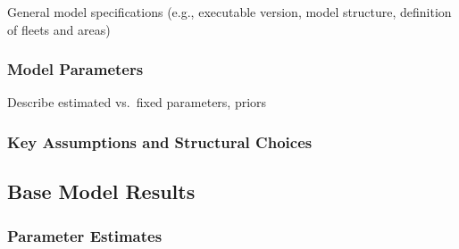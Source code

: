 \documentclass[11pt,
  english,
  a4paper,
]{article}
\begin{document}
\leavevmode\tagmcend\tagstructend


General model specifications (e.g., executable version, model structure, definition of fleets and areas)

\leavevmode\tagmcend\tagstructend\par


\hypertarget{model-parameters}{%
\subsubsection{Model Parameters}\label{model-parameters}}

\leavevmode\tagmcend\tagstructend


Describe estimated vs.~fixed parameters, priors

\leavevmode\tagmcend\tagstructend\par


\hypertarget{key-assumptions-and-structural-choices}{%
\subsubsection{Key Assumptions and Structural Choices}\label{key-assumptions-and-structural-choices}}

\leavevmode\tagmcend\tagstructend


\hypertarget{base-model-results}{%
\subsection{Base Model Results}\label{base-model-results}}

\leavevmode\tagmcend\tagstructend


\hypertarget{parameter-estimates}{%
\subsubsection{Parameter Estimates}\label{parameter-estimates}}

\leavevmode\tagmcend\tagstructend

\end{document}

